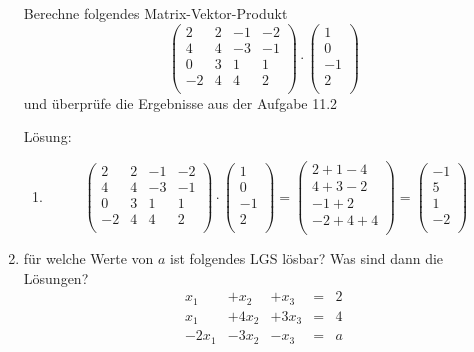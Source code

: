 \documentclass[main.tex]{subfiles}
\begin{document}
\begin{enumerate}
	      Berechne folgendes Matrix-Vektor-Produkt
	      \[  \begin{pmatrix}
			      2  & 2 & -1 & -2 \\
			      4  & 4 & -3 & -1 \\
			      0  & 3 & 1  & 1  \\
			      -2 & 4 & 4  & 2  \\
		      \end{pmatrix}
		      \cdot \begin{pmatrix}
			      1  \\
			      0  \\
			      -1 \\
			      2  \\
		      \end{pmatrix}  \]
	      und überprüfe die Ergebnisse aus der Aufgabe 11.2

	      Lösung:
	      \begin{enumerate}
		      \item \[
			            \begin{pmatrix}
				            2  & 2 & -1 & -2 \\
				            4  & 4 & -3 & -1 \\
				            0  & 3 & 1  & 1  \\
				            -2 & 4 & 4  & 2  \\
			            \end{pmatrix}
			            \cdot \begin{pmatrix}
				            1  \\
				            0  \\
				            -1 \\
				            2  \\
			            \end{pmatrix}
			            = \begin{pmatrix}
				            2 + 1 -4   \\
				            4 + 3 -2   \\
				            -1 + 2     \\
				            -2 + 4 + 4 \\
			            \end{pmatrix}
			            = \begin{pmatrix}
				            -1 \\
				            5  \\
				            1  \\
				            -2 \\
			            \end{pmatrix}
		            \]
	      \end{enumerate}
	\item für welche Werte von \( a \) ist folgendes LGS lösbar?
	      Was sind dann die Lösungen?
	      \[ \begin{array}{ccccc}
			      x_1   & +x_2  & +x_3  & = & 2 \\
			      x_1   & +4x_2 & +3x_3 & = & 4 \\
			      -2x_1 & -3x_2 & -x_3  & = & a \\
		      \end{array} \]


\end{enumerate}
\end{document}

